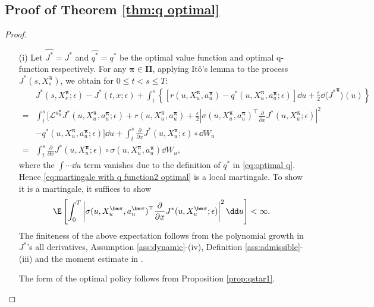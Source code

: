 \subsection{Proof of Theorem \ref{thm:q optimal}}
\begin{proof}
\begin{enumerate}
\item[(i)] Let $\widehat{J^*} = J^*$ and $\widehat{q^*} = q^*$ be the optimal value function and optimal q-function respectively. For any ${\bm\pi}\in {\bm\Pi}$, applying It\^o's lemma to the process ${J^*}(s,X_s^{\bm\pi})$, we obtain for $0\leq t <s\leq T$:
\[ \begin{aligned}
& {J^*}(s,{X}_{s}^{\bm\pi};\epsilon) - J^*(t,x;\epsilon) + \int_t^{s} \left\{ [r(u,{X}_{u}^{\bm\pi},a^{\bm\pi}_{u}) - {q^*}(u,{X}_{u}^{\bm\pi},a^{\bm\pi}_{u};\epsilon) ]\dd u + \frac{\epsilon}{2}\dd \langle {J^*}^{\bm\pi} \rangle(u) \right\} \\
= & \int_t^{s}\Bigg[ \mathcal{L}^{a_u^{\bm\pi}} J^*(u,{X}_{u}^{\bm\pi},a^{\bm\pi}_{u};\epsilon) + r(u,{X}_{u}^{\bm\pi},a^{\bm\pi}_{u}) + \frac{\epsilon}{2}\left| \sigma(u,{X}_{u}^{\bm\pi},a^{\bm\pi}_{u})^\top \frac{\partial }{\partial x}{J^*}(u,{X}_{u}^{\bm\pi};\epsilon) \right|^2 \\
&  - {q^*}(u,{X}_{u}^{\bm\pi},a^{\bm\pi}_{u};\epsilon) \Bigg]\dd u  + \int_t^{s}\frac{\partial }{\partial x}{J^*}(u,{X}_{u}^{\bm\pi};\epsilon) \circ \dd W_{u} \\
=&  \int_t^{s} \frac{\partial }{\partial x}{J^*}(u,{X}_{u}^{\bm\pi};\epsilon) \circ \sigma(u,{X}_{u}^{\bm\pi},a^{\bm\pi}_{u}) \dd W_{u} ,
\end{aligned}\]
where the $\int \cdots \dd u$ term vanishes due to the definition of $q^*$ in \eqref{eq:optimal q}. Hence \eqref{eq:martingale with q function2 optimal} is a local martingale. To show it is a martingale, it suffices to show 
\[ \E\left[ \int_0^{T}\left| \sigma(u,{X}_{u}^{\bm\pi},a^{\bm\pi}_{u})^\top \frac{\partial }{\partial x}{J^*}(u,{X}_{u}^{\bm\pi};\epsilon) \right|^2\dd u \right] < \infty .\]
The finiteness of the above expectation follows from the polynomial growth in $J^*$'s all derivatives, Assumption \ref{ass:dynamic}-(iv), Definition \ref{ass:admissible}-(iii) and the moment estimate in \citet[Lemma 2]{jia2022policypg}.

The form of the optimal policy follows from Proposition \ref{prop:qstar1}.



\end{enumerate}
\end{proof}
